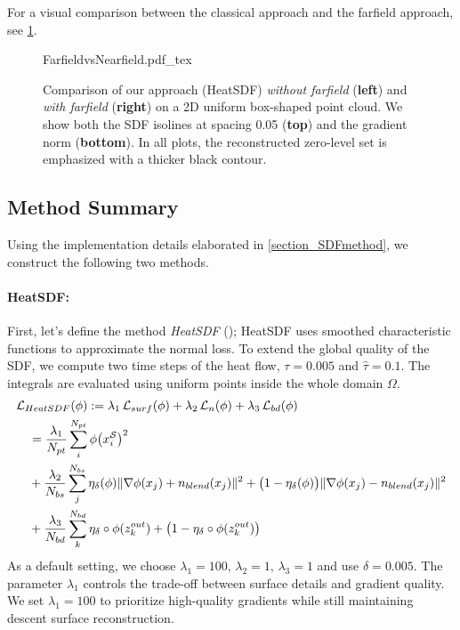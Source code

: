 \documentclass[draft,12pt,openany]{book}
\def\S{\mathcal{S}}
\theoremstyle{plainnormal}
\theoremstyle{remark}
\begin{document}
For a visual comparison between the classical approach and the farfield approach, see \cref{farfield_comp}.
\begin{figure}
    \centering
    \begingroup
    \sffamily  %
    \def\svgwidth{\textwidth}
    {FarfieldvsNearfield.pdf_tex}
    \endgroup
    \caption{Comparison of our approach (HeatSDF) \emph{without farfield} (\textbf{left}) and \emph{with farfield} (\textbf{right}) on a 2D uniform box-shaped point cloud. We show both the SDF isolines at spacing 0.05 (\textbf{top}) and the gradient norm (\textbf{bottom}). In all plots, the reconstructed zero-level set is emphasized with a thicker black contour.}\label{farfield_comp}
\end{figure}
\subsection{Method Summary}\label{ch:methodsummary} Using the implementation details elaborated in \cref{section_SDFmethod}, we construct the following two methods.
\paragraph{HeatSDF:} First, let's define the method \emph{HeatSDF} (\cite{weidemaier2025sdfsunorientedpointclouds}); HeatSDF uses smoothed characteristic functions to approximate the normal loss. To extend the global quality of the SDF, we compute two time steps of the heat flow, $\tau = 0.005$ and $\hat \tau = 0.1 $. The integrals are evaluated using uniform points inside the whole domain $\Omega$.
\begin{align}
    &\mathcal{L}_{HeatSDF}(\phi) := \lambda_1\, \mathcal{L}_{surf}(\phi) + \lambda _2\,\mathcal{L}_{n}(\phi) + \lambda_3\,\mathcal{L}_{bd}(\phi)\notag \\
    &\quad =\frac{\lambda_1}{N_{pt}}\sum_i^{N_{pt}}\phi\big( x_i^\S\big)^2
     \notag\\\notag & \quad + \frac{\lambda_2}{N_{bs}}\sum_j^{N_{bs}}
\eta_\delta(\phi) \|\nabla \phi(x_j) + n_{blend}(x_j)\|^2 + \big(1 - \eta_\delta(\phi)\big) \|\nabla \phi(x_j) - n_{blend}(x_j)\|^2 \notag\\ & \quad+ \frac{\lambda_3}{N_{bd}} \sum_k^{N_{bd}} \eta_\delta\circ\phi(z_k^{out}) +\big(1-\eta_\delta\circ\phi(z_k^{out})\big) 
\end{align}
As a default setting, we choose $\lambda_1 = 100, \,\lambda_2 = 1, \,\lambda_3 = 1$ and use $\delta = 0.005$. The parameter $\lambda_1$ controls the trade-off between surface details and gradient quality. We set $\lambda_1 = 100$ to prioritize high-quality gradients while still maintaining descent surface reconstruction.
\end{document}
